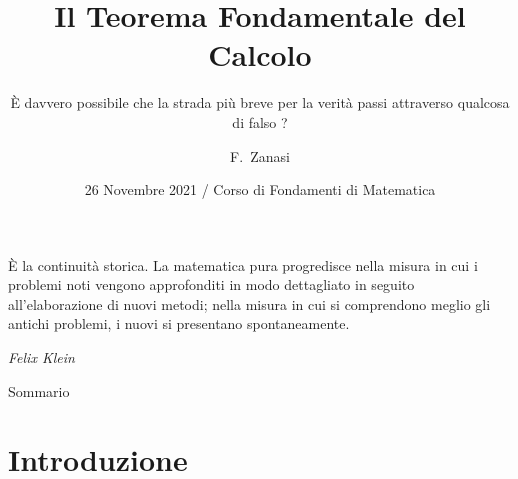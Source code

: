 \documentclass[8pt]{beamer}
\title[Il Teorema Fondamentale del Calcolo] %
{Il Teorema Fondamentale del Calcolo}
\subtitle
{È davvero possibile che la strada più breve per la verità passi attraverso qualcosa di falso ? \cite{Stillwell}} %
\author[F.~Zanasi, Matricola 154554] %
{F.~Zanasi\inst{1} }
\institute[Universities of Somewhere and Elsewhere] %
{
  \inst{1}%
  Corso di Laurea in Didattica e Comunicazione delle Scienze\\
  Università di Modena e Reggio Emilia
}
\date[Short Occasion] %
{26 Novembre 2021 / Corso di Fondamenti di Matematica}
\begin{document}
\begin{frame}
  \titlepage
  \epigraph{È la continuità storica. La matematica pura progredisce nella misura in cui i problemi noti vengono
  approfonditi in modo dettagliato in seguito all'elaborazione di nuovi metodi; nella misura in cui 
  si comprendono meglio gli antichi problemi, i nuovi si presentano spontaneamente.}{\textit{Felix Klein}}

\end{frame}

\begin{frame}{Sommario}
  \tableofcontents
\end{frame}

\section{Introduzione}
\end{document}
